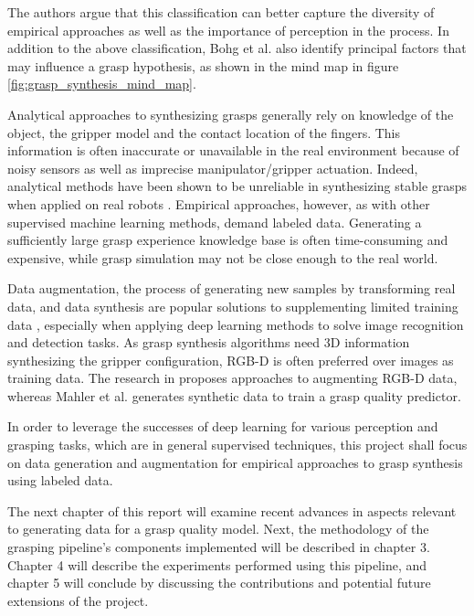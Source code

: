 The authors argue that this classification can better capture the diversity of empirical approaches as well as
the importance of perception in the process. In addition to the above classification, Bohg et al. \cite{Bohg2014}
also identify principal factors that may influence a grasp hypothesis, as shown in the mind map in figure
\ref{fig:grasp_synthesis_mind_map}.

Analytical approaches to synthesizing grasps generally rely on knowledge of the object, the gripper model and the
contact location of the fingers. This information is often inaccurate or unavailable in the real environment
because of noisy sensors as well as imprecise manipulator/gripper actuation. Indeed, analytical methods have been
shown to be unreliable in synthesizing stable grasps when applied on real robots
\cite{Kappler2015,Rubert2017,WeiszAllen2012}. Empirical approaches, however, as with other supervised machine
learning methods, demand labeled data. Generating a sufficiently large grasp experience knowledge base is often
time-consuming and expensive, while grasp simulation may not be close enough to the real world.

Data augmentation, the process of generating new samples by transforming real data, and data synthesis are popular
solutions to supplementing limited training data \cite{Fawzi2016,Shrivastava2017}, especially when applying deep
learning methods to solve image recognition and detection tasks. As grasp synthesis algorithms need 3D information
synthesizing the gripper configuration, RGB-D is often preferred over images as training data. The research in
\cite{Eitel2015,Gupta2014RGBDFeatures} proposes approaches to augmenting RGB-D data, whereas Mahler et al.
\cite{mahler2017} generates synthetic data to train a grasp quality predictor.

In order to leverage the successes of deep learning for various perception and grasping tasks, which are in general
supervised techniques, this project shall focus on data generation and augmentation for empirical approaches to grasp
synthesis using labeled data.

The next chapter of this report will examine recent advances in aspects relevant to generating data for a grasp quality
model. Next, the methodology of the grasping pipeline's components implemented will be described in chapter 3. Chapter 4
will describe the experiments performed using this pipeline, and chapter 5 will conclude by discussing the
contributions and potential future extensions of the project.
